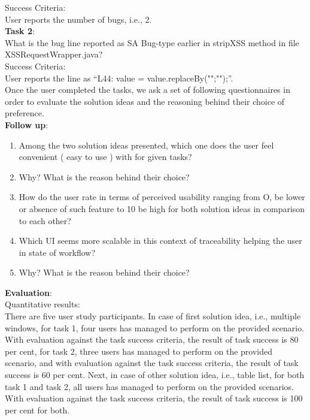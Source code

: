 Success Criteria: \\

User reports the number of bugs, i.e., 2. \\

\textbf{Task 2}: \\

What is the bug line reported as SA Bug-type earlier in stripXSS method in file XSSRequestWrapper.java? \\

Success Criteria: \\
 
User reports the line as “L44: value = value.replaceBy("";"");”. \\

Once the user completed the tasks, we ask a set of following questionnaires in order to evaluate the solution ideas and the reasoning behind their choice of preference. \\

\textbf{Follow up}: \\

\begin{enumerate}
\item Among the two solution ideas presented, which one does the user feel convenient ( easy to use ) with for given tasks?
\item Why? What is the reason behind their choice?
\item How do the user rate in terms of perceived usability ranging from O, be lower or absence of such feature to 10 be high for both solution ideas in comparison to each other?
\item Which UI seems more scalable in this context of traceability helping the user in state of workflow?
\item Why? What is the reason behind their choice?
\end{enumerate}

\textbf{Evaluation}: \\

Quantitative results: \\

There are five user study participants. In case of first solution idea, i.e., multiple windows, for task 1, four users has managed to perform on the provided scenario. With evaluation against the task success criteria, the result of task success is 80 per cent, for task 2, three users has managed to perform on the provided scenario, and with evaluation against the task success criteria, the result of task success is 60 per cent. Next, in case of other solution idea, i.e., table list, for both task 1 and task 2, all users has managed to perform on the provided scenarios. With evaluation against the task success criteria, the result of task success is 100 per cent for both. \\

